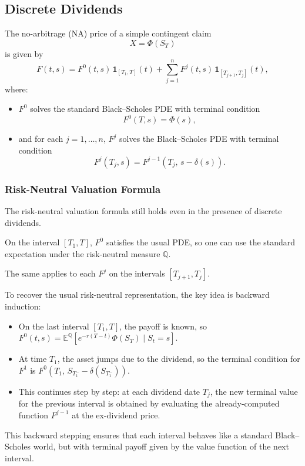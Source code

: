 \documentclass[12pt,a4paper]{article}
\theoremstyle{definition}
\begin{document}
\subsection{Discrete Dividends}

The no-arbitrage (NA) price of a simple contingent claim
\[
X = \Phi(S_T)
\]
is given by
\[
F(t, s) = F^0(t, s) \, \mathbf{1}_{[T_1, T]}(t) + \sum_{j=1}^n F^j(t, s) \, \mathbf{1}_{[T_{j+1}, T_j]}(t),
\]
where:
\begin{itemize}
\item $F^0$ solves the standard Black--Scholes PDE with terminal condition
\[
F^0(T, s) = \Phi(s),
\]
\item and for each $j = 1, \dots, n$, $F^j$ solves the Black--Scholes PDE with terminal condition
\[
F^j(T_j, s) = F^{j-1}(T_j, \, s - \delta(s)).
\]
\end{itemize}

\subsubsection{Risk-Neutral Valuation Formula}

The risk-neutral valuation formula still holds even in the presence of discrete dividends.

On the interval $[T_1, T]$, $F^0$ satisfies the usual PDE, so one can use the standard expectation under the risk-neutral measure $\mathbb{Q}$.

The same applies to each $F^j$ on the intervals $[T_{j+1}, T_j]$.

To recover the usual risk-neutral representation, the key idea is backward induction:
\begin{itemize}
\item On the last interval $[T_1, T]$, the payoff is known, so $F^0(t, s) = \mathbb{E}^\mathbb{Q}[e^{-r(T-t)}\Phi(S_T) \mid S_t=s]$.
\item At time $T_1$, the asset jumps due to the dividend, so the terminal condition for $F^1$ is $F^0(T_1, \, S_{T_1^-}-\delta(S_{T_1^-}))$.
\item This continues step by step: at each dividend date $T_j$, the new terminal value for the previous interval is obtained by evaluating the already-computed function $F^{j-1}$ at the ex-dividend price.
\end{itemize}

This backward stepping ensures that each interval behaves like a standard Black--Scholes world, but with terminal payoff given by the value function of the next interval.
\end{document}
